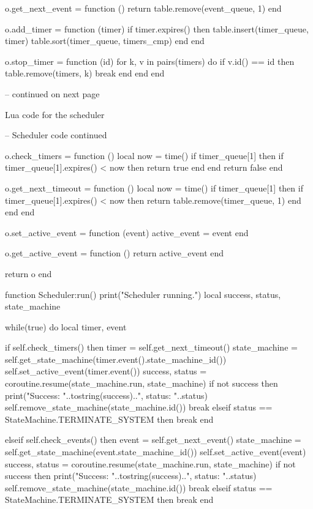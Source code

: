 \begin{appendices}
\begin{listing}[htp]
\begin{luacode}
	o.get_next_event = function ()
		return table.remove(event_queue, 1)
	end

	o.add_timer = function (timer)
		if timer.expires() then
			table.insert(timer_queue, timer)
			table.sort(timer_queue, timers_cmp)
		end
	end

	o.stop_timer = function (id)
		for k, v in pairs(timers) do
			if v.id() == id then
				table.remove(timers, k)
				break
			end
		end
	end

-- continued on next page
\end{luacode}
	\caption{Lua code for the scheduler}
	\label{code:scheduler}
\end{listing}

\begin{listing}[htp]
\begin{luacode}
-- Scheduler code continued

	o.check_timers = function ()
		local now = time()
		if timer_queue[1] then
			if timer_queue[1].expires() < now then return true end
		end
		return false
	end

	o.get_next_timeout = function ()
		local now = time()
		if timer_queue[1] then
			if timer_queue[1].expires() < now then return table.remove(timer_queue, 1) end
		end
	end

	o.set_active_event = function (event)
		active_event = event
	end

	o.get_active_event = function ()
		return active_event
	end

	return o
end

function Scheduler:run()
	print("Scheduler running.")
	local success, status, state_machine

	while(true) do	
		local timer, event
		
		if self.check_timers() then
			timer = self.get_next_timeout()
			state_machine = self.get_state_machine(timer.event().state_machine_id())
			self.set_active_event(timer.event())
			success, status = coroutine.resume(state_machine.run, state_machine)
			if not success then
				print("Success: "..tostring(success)..", status: "..status)
				self.remove_state_machine(state_machine.id())
				break
			elseif status == StateMachine.TERMINATE_SYSTEM then
				break
			end

		elseif self.check_events() then
			event = self.get_next_event()
			state_machine = self.get_state_machine(event.state_machine_id())
			self.set_active_event(event)
			success, status = coroutine.resume(state_machine.run, state_machine)
			if not success then
				print("Success: "..tostring(success)..", status: "..status)
				self.remove_state_machine(state_machine.id())
				break
			elseif status == StateMachine.TERMINATE_SYSTEM then
				break
			end


\end{luacode}
\end{listing}
\end{appendices}
